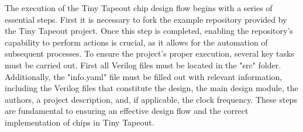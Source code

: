 The execution of the Tiny Tapeout chip design flow begins with a series of essential steps. First it is necessary to fork the example repository provided by the Tiny Tapeout project. Once this step is completed, enabling the repository's capability to perform actions is crucial, as it allows for the automation of subsequent processes. To ensure the project's proper execution, several key tasks must be carried out. First all Verilog files must be located in the "src" folder. Additionally, the "info.yaml" file must be filled out with relevant information, including the Verilog files that constitute the design, the main design module, the authors, a project description, and, if applicable, the clock frequency. These steps are fundamental to ensuring an effective design flow and the correct implementation of chips in Tiny Tapeout.